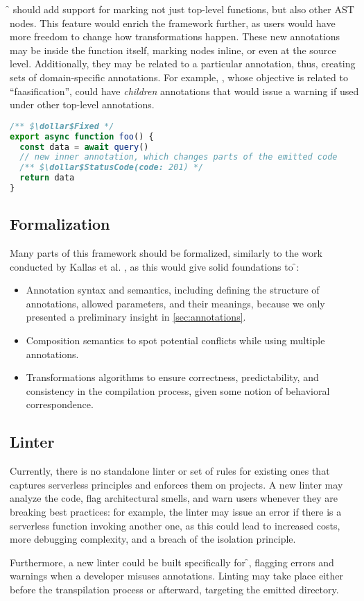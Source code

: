 \f{} should add support for marking not just top-level functions, but also other AST nodes.
This feature would enrich the framework further, as users would have more freedom
to change how transformations happen. These new annotations may be inside the function itself,
marking nodes inline, or even at the source level. Additionally, they may be related to a particular annotation,
thus, creating sets of domain-specific annotations.
For example, , whose objective is related to ``faasification'',
could have \textit{children} annotations that would issue a warning if used under other top-level annotations.
\begin{lstlisting}[language=javascript]
/** $\dollar$Fixed */
export async function foo() {
  const data = await query()
  // new inner annotation, which changes parts of the emitted code
  /** $\dollar$StatusCode(code: 201) */
  return data
}
\end{lstlisting}

\subsection{Formalization}

Many parts of this framework should be formalized, similarly to the work conducted by Kallas et al. \cite{formalization},
as this would give solid foundations to \f{}:

\begin{itemize}
  \item Annotation syntax and semantics, including defining
    the structure of annotations, allowed parameters, and their meanings,
    because we only presented a preliminary insight in \cref{sec:annotations}.

  \item Composition semantics to spot potential conflicts while using multiple annotations.

  \item Transformations algorithms to ensure correctness, predictability,
    and consistency in the compilation process, given some notion of behavioral correspondence.
\end{itemize}

\subsection{Linter}

Currently, there is no standalone linter or set of rules for existing ones
that captures serverless principles and enforces them on projects.
A new linter may analyze the code, flag architectural smells,
and warn users whenever they are breaking best practices:
for example, the linter may issue an error if there is a serverless function invoking another one,
as this could lead to increased costs, more debugging complexity, and a breach of the isolation principle.

Furthermore, a new linter could be built specifically for \f{},
flagging errors and warnings when a developer misuses annotations.
Linting may take place either before the transpilation process or afterward, targeting the emitted directory.
